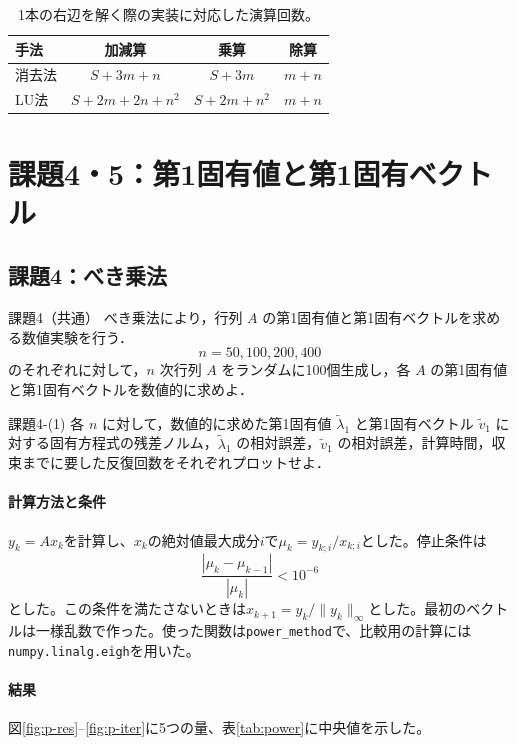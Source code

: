 \documentclass[a4paper,11pt]{article}
\begin{document}
\begin{table}[H]\centering\caption{1本の右辺を解く際の実装に対応した演算回数。}\label{tab:operations}
\begin{tabular}{lccc}\toprule 手法 & 加減算 & 乗算 & 除算\\\midrule
消去法 & $S+3m+n$ & $S+3m$ & $m+n$\\
LU法 & $S+2m+2n+n^2$ & $S+2m+n^2$ & $m+n$\\\bottomrule\end{tabular}\end{table}


\section{課題4・5：第1固有値と第1固有ベクトル}
\subsection{課題4：べき乗法}
\begin{itembox}[l]{課題4（共通）}
べき乗法により，行列 $A$ の第1固有値と第1固有ベクトルを求める数値実験を行う．
\[n=50,100,200,400\]
のそれぞれに対して，$n$ 次行列 $A$ をランダムに100個生成し，各 $A$ の第1固有値と第1固有ベクトルを数値的に求めよ．
\end{itembox}
\begin{itembox}[l]{課題4-(1)}
各 $n$ に対して，数値的に求めた第1固有値 $\tilde\lambda_1$ と第1固有ベクトル $\tilde v_1$ に対する固有方程式の残差ノルム，$\tilde\lambda_1$ の相対誤差，$\tilde v_1$ の相対誤差，計算時間，収束までに要した反復回数をそれぞれプロットせよ．
\end{itembox}
\paragraph{計算方法と条件}
$y_k=Ax_k$を計算し、$x_k$の絶対値最大成分$i$で$\mu_k=y_{k;i}/x_{k;i}$とした。停止条件は
\begin{equation}\frac{|\mu_k-\mu_{k-1}|}{|\mu_k|}<10^{-6}\label{eq:power-stop}\end{equation}
とした。この条件を満たさないときは$x_{k+1}=y_k/\|y_k\|_\infty$とした。最初のベクトルは一様乱数で作った。使った関数は\texttt{power\_method}で、比較用の計算には\texttt{numpy.linalg.eigh}を用いた。

\paragraph{結果}
図\ref{fig:p-res}--\ref{fig:p-iter}に5つの量、表\ref{tab:power}に中央値を示した。
\end{document}
